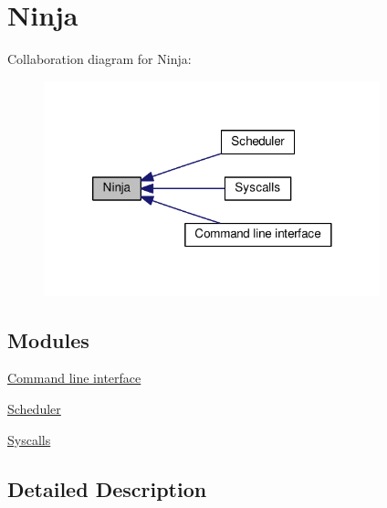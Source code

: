 \hypertarget{group__ninja}{\section{Ninja}
\label{group__ninja}
}
Collaboration diagram for Ninja\+:\nopagebreak
\begin{figure}[H]
\begin{center}
\leavevmode
\includegraphics[width=276pt]{group__ninja}
\end{center}
\end{figure}
\subsection*{Modules}
\begin{DoxyCompactItemize}
\item 
\hyperlink{group__cli}{Command line interface}
\item 
\hyperlink{group__scheduler}{Scheduler}
\item 
\hyperlink{group__syscalls}{Syscalls}
\end{DoxyCompactItemize}


\subsection{Detailed Description}
